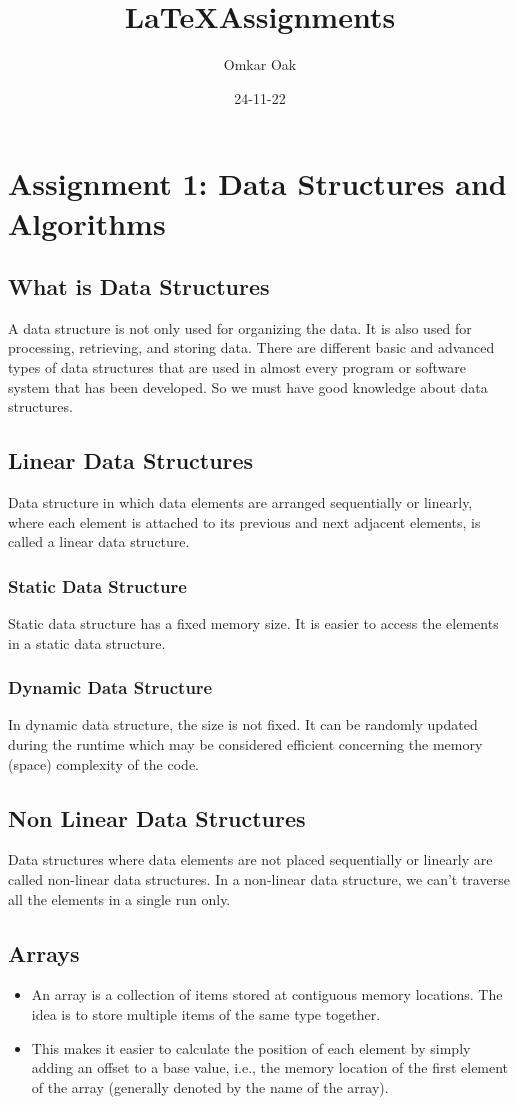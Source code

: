 \documentclass{article}
\title{\LaTeX Assignments}
\author{Omkar Oak}
\date{24-11-22}
\begin{document}
\maketitle
\tableofcontents
\newpage
\section{Assignment 1: Data Structures and Algorithms}
\subsection{What is Data Structures}
A data structure is not only used for organizing the data. It is also used for processing, retrieving, and storing data. There are different basic and advanced types of data structures that are used in almost every program or software system that has been developed. So we must have good knowledge about data structures.
\subsection{Linear Data Structures}
Data structure in which data elements are arranged sequentially or linearly, where each element is attached to its previous and next adjacent elements, is called a linear data structure. 
\subsubsection{Static Data Structure}
Static data structure has a fixed memory size. It is easier to access the elements in a static data structure. 
 \subsubsection{Dynamic Data Structure}
In dynamic data structure, the size is not fixed. It can be randomly updated during the runtime which may be considered efficient concerning the memory (space) complexity of the code. 
\subsection{Non Linear Data Structures}
Data structures where data elements are not placed sequentially or linearly are called non-linear data structures. In a non-linear data structure, we can’t traverse all the elements in a single run only.
\newpage
\subsection{Arrays} 
\begin{itemize}
\item An array is a collection of items stored at contiguous memory locations. The idea is to store multiple items of the same type together.
\item This makes it easier to calculate the position of each element by simply adding an offset to a base value, i.e., the memory location of the first element of the array (generally denoted by the name of the array).
\end{itemize}
\end{document}
